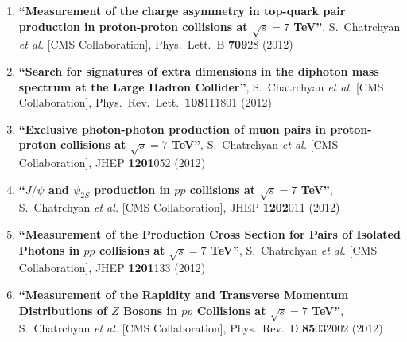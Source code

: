 \begin{enumerate}
\item%
{\bf ``Measurement of the charge asymmetry in top-quark pair production in proton-proton collisions at $\sqrt{s}=7$ TeV''}, 
  S.~Chatrchyan {\it et al.}  [CMS Collaboration], 
Phys.\ Lett.\ B {\bf 709}28 (2012) %


\item%
{\bf ``Search for signatures of extra dimensions in the diphoton mass spectrum at the Large Hadron Collider''}, 
  S.~Chatrchyan {\it et al.}  [CMS Collaboration], 
Phys.\ Rev.\ Lett.\  {\bf 108}111801 (2012) %


\item%
{\bf ``Exclusive photon-photon production of muon pairs in proton-proton collisions at $\sqrt{s}=7$ TeV''}, 
  S.~Chatrchyan {\it et al.}  [CMS Collaboration], 
JHEP {\bf 1201}052 (2012) %


\item%
{\bf ``$J/\psi$ and $\psi_{2S}$ production in $pp$ collisions at $\sqrt{s}=7$ TeV''}, 
  S.~Chatrchyan {\it et al.}  [CMS Collaboration], 
JHEP {\bf 1202}011 (2012) %


\item%
{\bf ``Measurement of the Production Cross Section for Pairs of Isolated Photons in $pp$ collisions at $\sqrt{s}=7$ TeV''}, 
  S.~Chatrchyan {\it et al.}  [CMS Collaboration], 
JHEP {\bf 1201}133 (2012) %


\item%
{\bf ``Measurement of the Rapidity and Transverse Momentum Distributions of $Z$ Bosons in $pp$ Collisions at $\sqrt{s}=7$ TeV''}, 
  S.~Chatrchyan {\it et al.}  [CMS Collaboration], 
Phys.\ Rev.\ D {\bf 85}032002 (2012) %



\end{enumerate}
